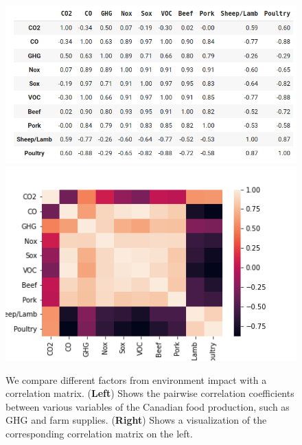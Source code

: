 \documentclass[11pt]{article}
\numberwithin{equation}{section}
\begin{document}
\begin{figure}[t]
\centering
\includegraphics[width=0.30\paperwidth, clip=true, trim=0mm 0mm 0mm 0mm]{figures/corr}
\includegraphics[width=0.30\paperwidth, clip=true, trim=0mm 0mm 0mm 0mm]{figures/matrix_1}

\caption{We compare different factors from environment impact with a correlation matrix. (\textbf{Left}) Shows the pairwise correlation  coefficients between various variables of the Canadian food production, such as GHG and farm supplies. (\textbf{Right}) Shows a visualization of the corresponding correlation matrix on the left.
}
\label{Example3fig}
\end{figure}
\end{document}
